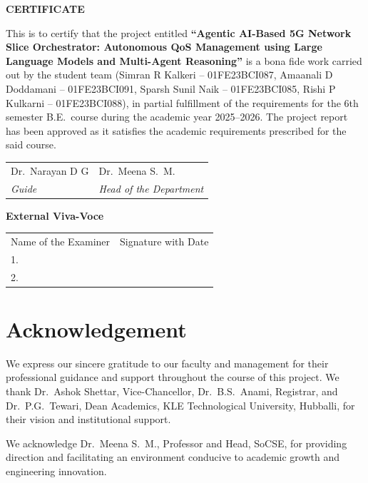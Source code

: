 \documentclass[12pt,a4paper]{report}
\begin{document}
\newpage\thispagestyle{empty}
\begin{center}{\Large\bfseries CERTIFICATE}\end{center}
\vspace{1cm}
\noindent
This is to certify that the project entitled \textbf{``Agentic AI-Based 5G Network Slice Orchestrator: Autonomous QoS Management using Large Language Models and Multi-Agent Reasoning''} is a bona fide work carried out by the student team (Simran R Kalkeri -- 01FE23BCI087, Amaanali D Doddamani -- 01FE23BCI091, Sparsh Sunil Naik -- 01FE23BCI085, Rishi P Kulkarni -- 01FE23BCI088), in partial fulfillment of the requirements for the 6th semester B.E.\ course during the academic year 2025--2026. The project report has been approved as it satisfies the academic requirements prescribed for the said course.
\vspace{2cm}\\
\begin{tabular}{p{6cm}p{6cm}}
Dr.\ Narayan D G & Dr.\ Meena S.\ M. \\
\textit{Guide} & \textit{Head of the Department}
\end{tabular}
\vspace{2cm}
\begin{center}{\bfseries External Viva-Voce}\end{center}
\begin{tabular}{p{9cm}p{5cm}}
Name of the Examiner & Signature with Date \\[0.8cm]
1.\ \dotfill & \dotfill \\[0.8cm]
2.\ \dotfill & \dotfill \\
\end{tabular}

\newpage\thispagestyle{empty}
\chapter*{Acknowledgement}
We express our sincere gratitude to our faculty and management for their professional guidance and support throughout the course of this project. We thank Dr.\ Ashok Shettar, Vice-Chancellor, Dr.\ B.S.\ Anami, Registrar, and Dr.\ P.G.\ Tewari, Dean Academics, KLE Technological University, Hubballi, for their vision and institutional support.

We acknowledge Dr.\ Meena S.\ M., Professor and Head, SoCSE, for providing direction and facilitating an environment conducive to academic growth and engineering innovation.
\end{document}
